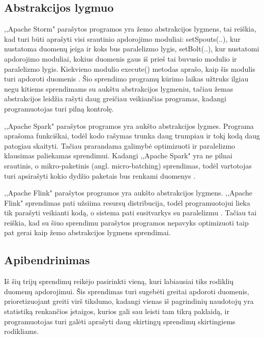 \documentclass{VUMIFPSkursinis}
\begin{document}
\subsection{Abstrakcijos lygmuo}

,,Apache Storm" parašytos programos yra žemo abstrakcijos lygmens, tai reiškia, kad turi būti aprašyti visi srautinio apdorojimo moduliai: 
setSpouts(..), kur nustatoma duomenų įeiga ir koks bus paralelizmo lygis, setBolt(..), kur nustatomi apdorojimo moduliai,
kokius duomenis gaus iš prieš tai buvusio modulio ir paralelizmo lygis. Kiekvieno modulio execute() metodas aprašo, kaip šis modulis 
turi apdoroti duomenis \cite{tutpoint}. Šio sprendimo programų kūrimo laikas užtruks ilgiau negu kitiems sprendimams su aukštu abstrakcijos lygmeniu,
tačiau žemas abstrakcijos leidžia rašyti daug greičiau veikiančias programas, kadangi programuotojas turi pilną kontrolę.

,,Apache Spark" parašytos programos yra aukšto abstrakcijos lygmes. 
Programa aprašoma funkciškai, todėl kodo rašymas trunka daug trumpiau ir tokį kodą daug patogiau skaityti. Tačiau prarandama galimybė optimizuoti
ir paralelizmo klausimas paliekamas sprendimui. Kadangi ,,Apache Spark" yra ne pilnai srautinis, o mikro-paketinis (angl. micro-batching) 
sprendimas, todėl vartotojas turi apsirašyti kokio dydžio paketais bus renkami duomenys \cite{shoro2015big}.

,,Apache Flink" parašytos programos yra aukšto abstrakcijos lygmens. ,,Apache Flink" 
sprendimas pati užsiima resursų distribucija, todėl programuotojui lieka tik parašyti veikianti kodą, o sistema pati susitvarkys su paralelizmu \cite{flinkdoc}. Tačiau 
tai reiškia, kad su šiuo sprendimu parašytos programos nepavyks optimizuoti taip pat gerai kaip žemo abstrakcijos lygmens sprendimai.

\subsection{Apibendrinimas}
Iš šių trijų sprendimų reikėjo pasirinkti vieną, kuri labiausiai tiks rodiklių duomenų apdorojimui. Šis sprendimas turi sugebėti greitai apdoroti duomenis,
prioretizuojant greiti virš tikslumo, kadangi vienas iš pagrindinių naudotojų yra statistiką renkančios įstaigos, kurios gali sau leisti tam tikrą paklaidą,
ir programuotojas turi galėti aprašyti daug skirtingų sprendimų skirtingiems rodikliams.\par
\end{document}
